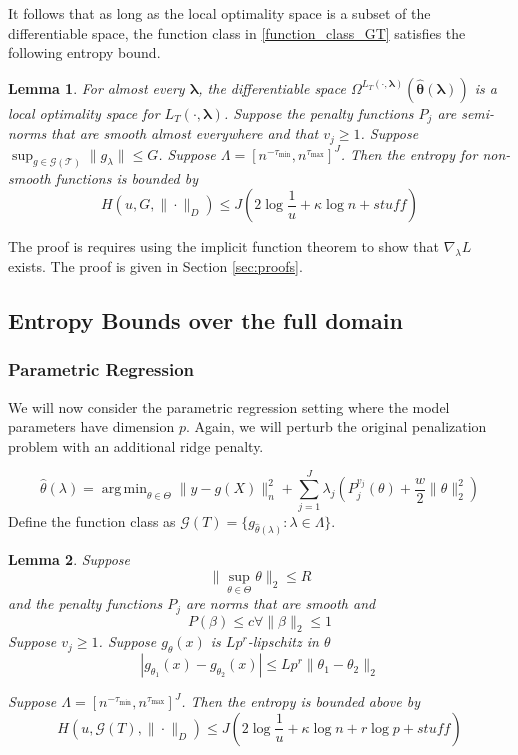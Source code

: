 \documentclass[12pt]{article}
\newtheorem{lemma}{Lemma}
\DeclareMathOperator*{\argmin}{arg\,min}
\begin{document}
It follows that as long as the local optimality space is a subset of the differentiable space, the function class in \eqref{function_class_GT} satisfies the following entropy bound. 

\begin{lemma}
\label{nonsmooth_entropy}
For almost every $\boldsymbol{\lambda}$, the differentiable space $\Omega^{L_T(\cdot, \boldsymbol{\lambda})}(\hat{\boldsymbol \theta}\left(\boldsymbol{\lambda}\right))$ is a local optimality space for $L_T\left(\cdot,\boldsymbol{\lambda}\right)$. 
Suppose the penalty functions $P_j$ are semi-norms that are smooth almost everywhere and that $v_j \ge 1$. Suppose $\sup_{g \in \mathcal{G(T)}} \|g_\lambda\| \le G$. 
Suppose $\Lambda = [n^{- \tau_{\min}} , n^{\tau_{\max}}]^J$.
Then the entropy for non-smooth functions is bounded by 
\begin{equation}
H \left ( u, G, \| \cdot \|_D \right ) \le J \left ( 2 \log \frac{1}{u} + \kappa \log n + stuff \right )
\end{equation}
\end{lemma}

The proof is requires using the implicit function theorem to show that $\nabla_{\lambda} L$ exists. The proof is given in Section \ref{sec:proofs}.

\subsection{Entropy Bounds over the full domain}

\subsubsection{Parametric Regression}
We will now consider the parametric regression setting where the model parameters have dimension $p$. Again, we will perturb the original penalization problem with an additional ridge penalty.

\begin{equation}
\hat{\theta}(\lambda) = \argmin_{\theta \in \Theta} \| y -  g(X) \|^2_n + \sum_{j=1}^J \lambda_j \left ( P^{v_j}_j(\theta) + \frac{w}{2} \| \theta \|^2_2 \right )
\end{equation}
Define the function class as $\mathcal{G}(T) = \{ g_{\hat{\theta}(\lambda)} : \lambda \in \Lambda \}$.

\begin{lemma}
Suppose 
\[
\|\sup_{\theta\in\Theta}\theta\|_{2}\le R
\]
and the penalty functions $P_j$ are norms that are smooth and
\[
P(\beta)\le c\forall\|\beta\|_{2}\le1
\]
Suppose $v_j \ge 1$.
Suppose $g_{\theta}(x)$ is $Lp^r$-lipschitz in $\theta$
\[
\left|g_{\theta_{1}}(x)-g_{\theta_{2}}(x)\right|\le Lp^r \|\theta_{1}-\theta_{2}\|_2
\]


Suppose $\Lambda = [n^{- \tau_{\min}} , n^{\tau_{\max}}]^J$. 
Then the entropy is bounded above by
\begin{equation}
H \left ( u, \mathcal{G}(T), \| \cdot \|_D \right ) \le J \left ( 2 \log \frac{1}{u} + \kappa \log n + r \log p + stuff \right )
\end{equation}
\end{lemma}
\end{document}
